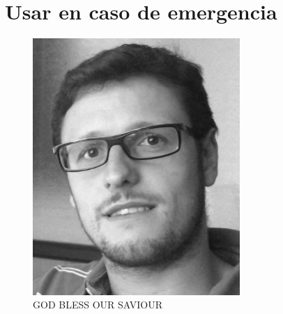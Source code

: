 \documentclass[oneside]{book}
\begin{document}
	\section{Usar en caso de emergencia}
	\begin{figure}[h]
		\centering
		\includegraphics[width=0.7\textwidth]{foto}
		\caption*{GOD BLESS OUR SAVIOUR}
	\end{figure}
	\backmatter
	\printindex
\end{document}
